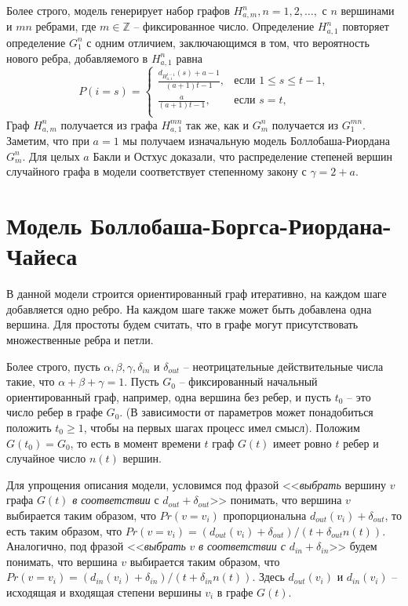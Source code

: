 \documentclass[14pt]{extreport}
\begin{document}
Более строго, модель генерирует набор графов $H_{a, m}^n, n=1, 2,\dots,$ с $n$ вершинами и $mn$ ребрами, где $m \in \mathbb{Z}$ -- фиксированное число. Определение $H_{a, 1}^n$ повторяет определение $G_1^n$ с одним отличием, заключающимся в том, что вероятность нового ребра, добавляемого в $H_{a, 1}^n$ равна
$$  
P(i=s) =
\begin{cases}  
  \frac{d_{H_{a, 1}^{t-1}}(s)+a-1}{(a+1)t-1},&\text{если $1 \le s \le t-1$,}\\
  \frac{a}{(a+1)t-1},&\text{если $s=t$,}\\
\end{cases}
$$  
Граф $H_{a, m}^n$ получается из графа $H_{a, 1}^{mn}$ так же, как и $G_m^n$ получается из $G_1^{mn}$. Заметим, что при $a=1$ мы получаем изначальную модель Боллобаша-Риордана $G_m^n$. Для целых $a$ Бакли и Остхус доказали, что распределение степеней вершин случайного графа в модели соответствует степенному закону с $\gamma = 2 + a$.
 
\section{Модель Боллобаша-Боргса-Риордана-Чайеса}

В данной модели строится ориентированный граф итеративно, на каждом шаге добавляется одно ребро. На каждом шаге также может быть добавлена одна вершина. Для простоты будем считать, что в графе могут присутствовать множественные ребра и петли.

Более строго, пусть $\alpha, \beta, \gamma, \delta_{in}$ и $\delta_{out}$ -- неотрицательные действительные числа такие, что $\alpha + \beta + \gamma = 1$. Пусть $G_0$ -- фиксированный начальный ориентированный граф, например, одна вершина без ребер, и пусть $t_0$ -- это число ребер в графе $G_0$. (В зависимости от параметров может понадобиться положить $t_0 \ge 1$, чтобы на первых шагах процесс имел смысл). Положим $G(t_0) = G_0$, то есть в момент времени $t$ граф $G(t)$ имеет ровно $t$ ребер и случайное число $n(t)$ вершин.

Для упрощения описания модели, условимся под фразой <<{\it выбрать} вершину $v$ графа $G(t)$ {\it в соответствии} с $d_{out} + \delta_{out}$>> понимать, что вершина $v$ выбирается таким образом, что $Pr(v=v_i)$ пропорциональна $d_{out}(v_i) + \delta_{out}$, то есть таким образом, что $Pr(v=v_i)=(d_{out}(v_i) + \delta_{out})/(t  + \delta_{out}n(t))$. Аналогично, под фразой <<{\it выбрать} $v$ {\it в соответствии с} $d_{in} + \delta_{in}$>> будем понимать, что вершина $v$ выбирается таким образом, что $Pr(v=v_i)=(d_{in}(v_i) + \delta_{in})/(t  + \delta_{in}n(t))$. Здесь $d_{out}(v_i)$ и $d_{in}(v_i)$ -- исходящая и входящая степени вершины $v_i$ в графе $G(t)$.
\end{document}
